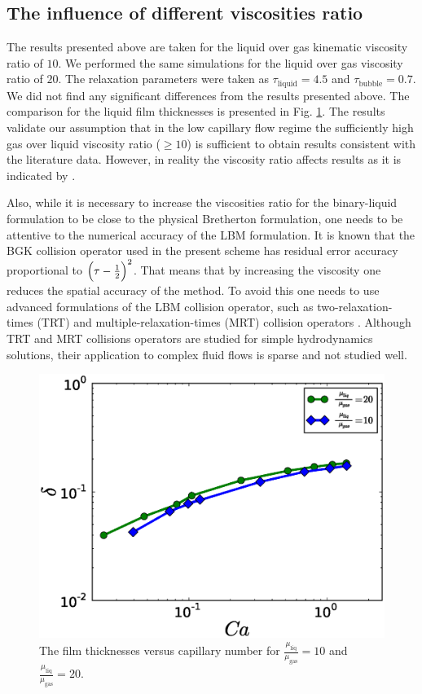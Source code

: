 \documentclass[preprint,12pt]{elsarticle}
\begin{document}
\subsection{The influence of different viscosities ratio}
The results presented above are taken for the liquid over gas kinematic viscosity ratio of $10$.
We performed the same simulations for the liquid over gas viscosity ratio of $20$.
The relaxation parameters were taken as $\tau_{\mathrm{liquid}}=4.5$ and $\tau_{\mathrm{bubble}}=0.7$. We
did not find any significant differences from the results presented above. The
comparison for the liquid film thicknesses is presented in Fig.
\ref{fig:capillary:viscous}. The results validate our assumption that in
the low capillary flow regime the sufficiently high gas over liquid viscosity ratio ($\geq 10$)
is sufficient to obtain results
consistent with the literature data. 
{\color{red} However, in reality the viscosity ratio affects results as it
is indicated by \citet{shikazono-square}.}

{\color{red} Also, while it is necessary to increase the viscosities ratio for the binary-liquid
formulation to be close to the physical Bretherton formulation, one needs to be attentive to the
numerical accuracy of the LBM formulation. It is known \cite{ginzburg-trt-simple-hydro} that the
BGK collision operator used in the present scheme has residual error accuracy proportional
to $\Bigl(\tau-\frac{1}{2}\Bigr)^2$. That means that by increasing the viscosity one reduces the
spatial
accuracy of the method. To avoid this one needs to use advanced formulations of the LBM collision
operator, such as two-relaxation-times (TRT) and multiple-relaxation-times (MRT) collision operators
\cite{ginzburg-main}. Although TRT and MRT collisions operators are studied for simple
hydrodynamics solutions, their application to complex fluid flows is sparse and not studied
well.
}
\begin{figure}
\includegraphics[width=\textwidth]{Figures/Capillary_Viscous/capillaries_viscous.eps}
\caption{The film thicknesses versus capillary number for
$\frac{\mu_{\mathrm{liq}}}{\mu_{\mathrm{gas}}}=10$ and $\frac{\mu_{\mathrm{liq}}}{\mu_{\mathrm{gas}}}=20$. \label{fig:capillary:viscous}}
\end{figure}
\end{document}
